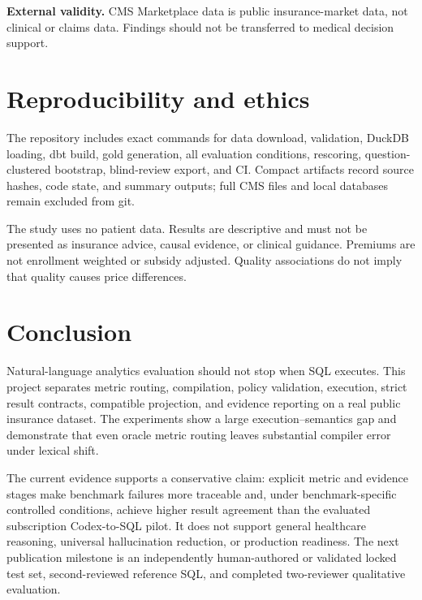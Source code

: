 \documentclass[11pt]{article}
\begin{document}
\medskip\noindent\textbf{External validity.} CMS Marketplace data is public
insurance-market data, not clinical or claims data. Findings should not be
transferred to medical decision support.

\section{Reproducibility and ethics}
The repository includes exact commands for data download, validation, DuckDB
loading, dbt build, gold generation, all evaluation conditions, rescoring,
question-clustered bootstrap, blind-review export, and CI. Compact artifacts
record source hashes, code state, and summary outputs; full CMS files and local
databases remain excluded from git.

The study uses no patient data. Results are descriptive and must not be presented
as insurance advice, causal evidence, or clinical guidance. Premiums are not
enrollment weighted or subsidy adjusted. Quality associations do not imply that
quality causes price differences.

\section{Conclusion}
Natural-language analytics evaluation should not stop when SQL executes. This
project separates metric routing, compilation, policy validation, execution,
strict result contracts, compatible projection, and evidence reporting on a real
public insurance dataset. The experiments show a large execution--semantics gap
and demonstrate that even oracle metric routing leaves substantial compiler error
under lexical shift.

The current evidence supports a conservative claim: explicit metric and evidence
stages make benchmark failures more traceable and, under benchmark-specific
controlled conditions, achieve higher result agreement than the evaluated
subscription Codex-to-SQL pilot. It does not support general healthcare
reasoning, universal hallucination reduction, or production readiness. The next
publication milestone is an independently human-authored or validated locked test
set, second-reviewed reference SQL, and completed two-reviewer qualitative
evaluation.
\end{document}
